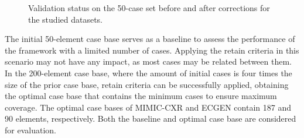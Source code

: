 \begin{figure}[t!]
    \centering
    \caption{Validation status on the 50-case set before and after corrections for the studied datasets.}
    \label{fig:50_set_comparison}
\end{figure}

The initial 50-element case base serves as a baseline to assess the performance of the framework with a limited number of cases. Applying the retain criteria in this scenario may not have any impact, as most cases may be related between them. In the 200-element case base, where the amount of initial cases is four times the size of the prior case base, retain criteria can be successfully applied, obtaining the optimal case base that contains the minimum cases to ensure maximum coverage. The optimal case bases of MIMIC-CXR and ECGEN contain 187 and 90 elements, respectively. Both the baseline and optimal case base are considered for evaluation.

